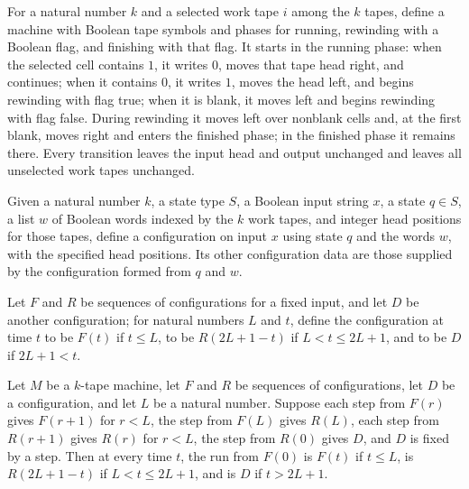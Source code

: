 \begin{definition}
\label{Turing.incrementTM}
\leanok
{}
For a natural number $k$ and a selected work tape $i$ among the $k$ tapes, define a
machine with Boolean tape symbols and phases for running, rewinding with a Boolean flag,
and finishing with that flag. It starts in the running phase: when the selected cell
contains $1$, it writes $0$, moves that tape head right, and continues; when it contains
$0$, it writes $1$, moves the head left, and begins rewinding with flag true; when it is
blank, it moves left and begins rewinding with flag false. During rewinding it moves
left over nonblank cells and, at the first blank, moves right and enters the finished
phase; in the finished phase it remains there. Every transition leaves the input head
and output unchanged and leaves all unselected work tapes unchanged.
\end{definition}

\begin{definition}
\label{Turing.catalogCfg}
\leanok
{}
Given a natural number $k$, a state type $S$, a Boolean input string $x$, a state $q\in
S$, a list $w$ of Boolean words indexed by the $k$ work tapes, and integer head
positions for those tapes, define a configuration on input $x$ using state $q$ and the
words $w$, with the specified head positions. Its other configuration data are those
supplied by the configuration formed from $q$ and $w$.
\end{definition}

\begin{definition}
\label{Turing.catalogTrace}
\leanok
{}
Let $F$ and $R$ be sequences of configurations for a fixed input, and let $D$ be another
configuration; for natural numbers $L$ and $t$, define the configuration at time $t$ to
be $F(t)$ if $t\le L$, to be $R(2L+1-t)$ if $L<t\le 2L+1$, and to be $D$ if $2L+1<t$.
\end{definition}

\begin{theorem}
\label{Turing.catalog_trace_run}
\leanok
{}
Let $M$ be a $k$-tape machine, let $F$ and $R$ be sequences of configurations, let $D$
be a configuration, and let $L$ be a natural number. Suppose each step from $F(r)$ gives
$F(r+1)$ for $r<L$, the step from $F(L)$ gives $R(L)$, each step from $R(r+1)$ gives
$R(r)$ for $r<L$, the step from $R(0)$ gives $D$, and $D$ is fixed by a step. Then at
every time $t$, the run from $F(0)$ is $F(t)$ if $t\le L$, is $R(2L+1-t)$ if $L<t\le
2L+1$, and is $D$ if $t>2L+1$.
\end{theorem}

